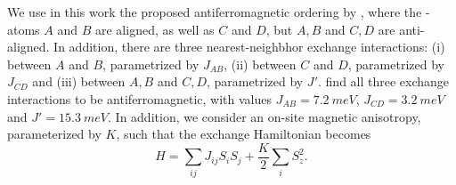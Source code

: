 We use in this work the proposed antiferromagnetic ordering by \textcite{gonzalezHematene2DMagnetic2019}, where the -atoms $A$ and $B$ are aligned, as well as $C$ and $D$, but $A,B$ and $C,D$ are anti-aligned. In addition, there are three nearest-neighbhor exchange interactions: (i) between $A$ and $B$, parametrized by $J_{AB}$, (ii) between $C$ and $D$, parametrized by $J_{CD}$ and (iii) between $A,B$ and $C,D$, parametrized by $J'$. \textcite{gonzalezHematene2DMagnetic2019} find all three exchange interactions to be antiferromagnetic, with values $J_{AB}=\SI{7.2}{meV}$, $J_{CD}=\SI{3.2}{meV}$ and $J'=\SI{15.3}{meV}$. In addition, we consider an on-site magnetic anisotropy, parameterized by $K$, such that the exchange Hamiltonian becomes
\begin{equation}
	H = \sum_{ij} J_{ij} S_i S_j + \frac{K}{2} \sum_i S_z^2.
\end{equation}


